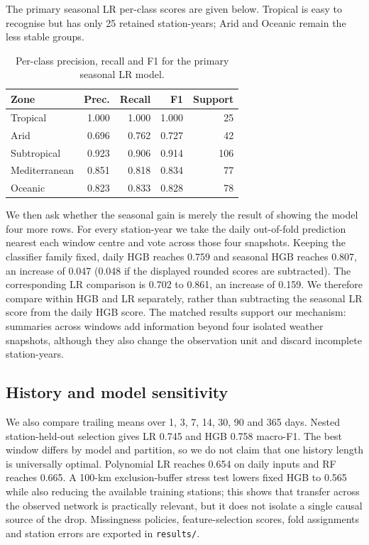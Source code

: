 \documentclass{article}
\newcommand{\DailyRF}{0.665}
\newcommand{\SeasonLR}{0.861}
\newcommand{\SeasonHGB}{0.807}
\newcommand{\MatchedDaily}{0.759}
\newcommand{\SeasonGain}{0.047}
\newcommand{\MatchedLR}{0.702}
\newcommand{\SeasonLRGain}{0.159}
\newcommand{\DailyPoly}{0.654}
\newcommand{\HistoryHGB}{0.758}
\newcommand{\HistoryLR}{0.745}
\newcommand{\SpatialHGB}{0.565}
\begin{document}
The primary seasonal LR per-class scores are given below. Tropical is easy to recognise but has only 25 retained station-years; Arid and Oceanic remain the less stable groups.

\begin{table}[t]
\centering
\small
\setlength{\tabcolsep}{4pt}
\caption{Per-class precision, recall and F1 for the primary seasonal LR model.}\label{tab:class}
\begin{tabular}{lrrrr}\toprule
Zone & Prec. & Recall & F1 & Support \\ \midrule
Tropical & 1.000 & 1.000 & 1.000 & 25 \\
Arid & 0.696 & 0.762 & 0.727 & 42 \\
Subtropical & 0.923 & 0.906 & 0.914 & 106 \\
Mediterranean & 0.851 & 0.818 & 0.834 & 77 \\
Oceanic & 0.823 & 0.833 & 0.828 & 78 \\
\bottomrule
\end{tabular}
\end{table}

We then ask whether the seasonal gain is merely the result of showing the model four more rows. For every station-year we take the daily out-of-fold prediction nearest each window centre and vote across those four snapshots. Keeping the classifier family fixed, daily HGB reaches \MatchedDaily{} and seasonal HGB reaches \SeasonHGB{}, an increase of \SeasonGain{} (0.048 if the displayed rounded scores are subtracted). The corresponding LR comparison is \MatchedLR{} to \SeasonLR{}, an increase of \SeasonLRGain{}. We therefore compare within HGB and LR separately, rather than subtracting the seasonal LR score from the daily HGB score. The matched results support our mechanism: summaries across windows add information beyond four isolated weather snapshots, although they also change the observation unit and discard incomplete station-years.

\subsection{History and model sensitivity}
We also compare trailing means over 1, 3, 7, 14, 30, 90 and 365 days. Nested station-held-out selection gives LR \HistoryLR{} and HGB \HistoryHGB{} macro-F1. The best window differs by model and partition, so we do not claim that one history length is universally optimal. Polynomial LR reaches \DailyPoly{} on daily inputs and RF reaches \DailyRF{}. A 100-km exclusion-buffer stress test lowers fixed HGB to \SpatialHGB{} while also reducing the available training stations; this shows that transfer across the observed network is practically relevant, but it does not isolate a single causal source of the drop. Missingness policies, feature-selection scores, fold assignments and station errors are exported in \texttt{results/}.
\end{document}

